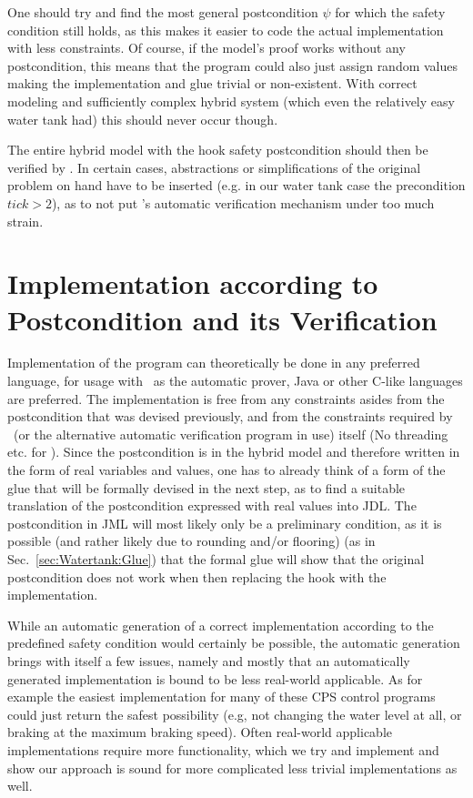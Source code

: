 One should try and find the most general postcondition \(\psi\) for which the safety condition still holds, as this makes it easier to code the actual implementation with less constraints. Of course, if the model's proof works without any postcondition, this means that the program could also just assign random values making the implementation and glue trivial or non-existent. With correct modeling and sufficiently complex hybrid system (which even the relatively easy water tank had) this should never occur though.

The entire hybrid model with the hook safety postcondition should then be verified by \keym. In certain cases, abstractions or simplifications of the original problem on hand have to be inserted (e.g. in our water tank case the precondition \(tick>2\)), as to not put \keym's automatic verification mechanism under too much strain.

\section{Implementation according to Postcondition and its Verification}
\label{sec:Process:Implementation}

Implementation of the program can theoretically be done in any preferred language, for usage with \key~as the automatic prover, Java or other C-like languages are preferred. The implementation is free from any constraints asides from the postcondition that was devised previously, and from the constraints required by \key~(or the alternative automatic verification program in use) itself (No threading etc. for \key). Since the postcondition is in the hybrid model and therefore written in the form of real variables and values, one has to already think of a form of the glue that will be formally devised in the next step, as to find a suitable translation of the postcondition expressed with real values into JDL. The postcondition in JML will most likely only be a preliminary condition, as it is possible (and rather likely due to rounding and/or flooring) (as in Sec.~\ref{sec:Watertank:Glue}) that the formal glue will show that the original postcondition does not work when then replacing the hook with the implementation. 

While an automatic generation of a correct implementation according to the predefined safety condition would certainly be possible, the automatic generation brings with itself a few issues, namely and mostly that an automatically generated implementation is bound to be less real-world applicable. As for example the easiest implementation for many of these CPS control programs could just return the safest possibility (e.g, not changing the water level at all, or braking at the maximum braking speed). Often real-world applicable implementations require more functionality, which we try and implement and show our approach is sound for more complicated less trivial implementations as well.

